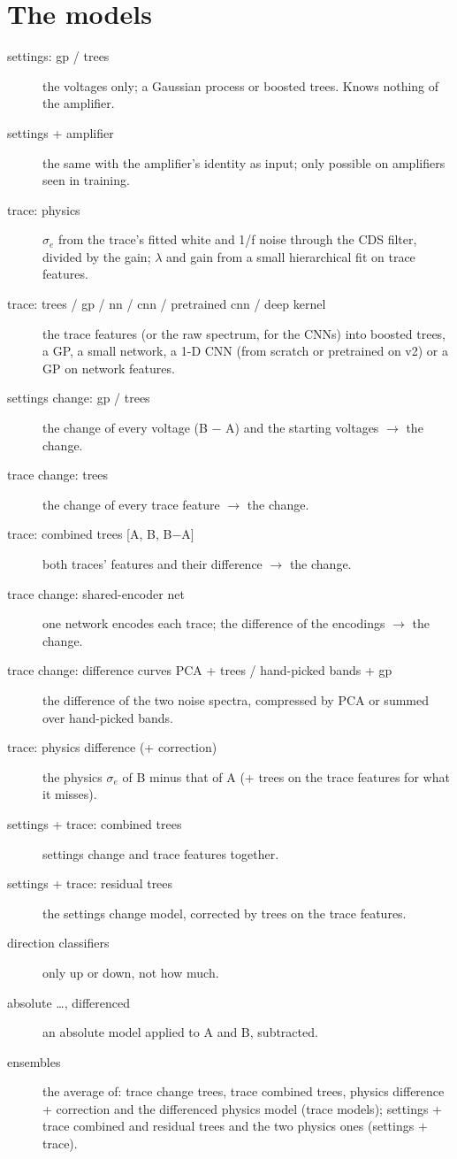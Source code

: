 \documentclass[11pt]{article}
\begin{document}
\section{The models}\label{app:models}
\begin{description}
\item[settings: gp / trees] the voltages only; a Gaussian process or boosted trees. Knows nothing of the amplifier.
\item[settings + amplifier] the same with the amplifier's identity as input; only possible on amplifiers seen in
  training.
\item[trace: physics] $\sigma_e$ from the trace's fitted white and 1/f noise through the CDS filter, divided by the
  gain; $\lambda$ and gain from a small hierarchical fit on trace features.
\item[trace: trees / gp / nn / cnn / pretrained cnn / deep kernel] the trace features (or the raw spectrum, for the CNNs)
  into boosted trees, a GP, a small network, a 1-D CNN (from scratch or pretrained on v2) or a GP on network features.
\item[settings change: gp / trees] the change of every voltage (B $-$ A) and the starting voltages $\to$ the change.
\item[trace change: trees] the change of every trace feature $\to$ the change.
\item[trace: combined trees {[A, B, B$-$A]}] both traces' features and their difference $\to$ the change.
\item[trace change: shared-encoder net] one network encodes each trace; the difference of the encodings $\to$ the
  change.
\item[trace change: difference curves PCA + trees / hand-picked bands + gp] the difference of the two noise spectra,
  compressed by PCA or summed over hand-picked bands.
\item[trace: physics difference (+ correction)] the physics $\sigma_e$ of B minus that of A (+ trees on the trace
  features for what it misses).
\item[settings + trace: combined trees] settings change and trace features together.
\item[settings + trace: residual trees] the settings change model, corrected by trees on the trace features.
\item[direction classifiers] only up or down, not how much.
\item[absolute \dots, differenced] an absolute model applied to A and B, subtracted.
\item[ensembles] the average of: trace change trees, trace combined trees, physics difference + correction and the
  differenced physics model (trace models); settings + trace combined and residual trees and the two physics ones
  (settings + trace).
\end{description}
\end{document}
